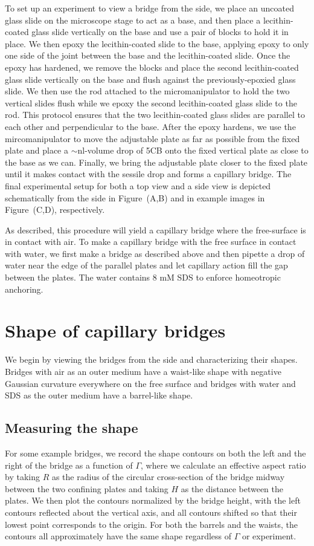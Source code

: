 To set up an experiment to view a bridge from the side, we place an uncoated glass slide on the microscope stage to act as a base, and then place a lecithin-coated glass slide vertically on the base and use a pair of blocks to hold it in place.
We then epoxy the lecithin-coated slide to the base, applying epoxy to only one side of the joint between the base and the lecithin-coated slide.
Once the epoxy has hardened, we remove the blocks and place the second lecithin-coated glass slide vertically on the base and flush against the previously-epoxied glass slide.
We then use the rod attached to the micromanipulator to hold the two vertical slides flush while we epoxy the second lecithin-coated glass slide to the rod.
This protocol ensures that the two lecithin-coated glass slides are parallel to each other and perpendicular to the base.
After the epoxy hardens, we use the mircomanipulator to move the adjustable plate as far as possible from the fixed plate and place a $\sim$nl-volume drop of 5CB onto the fixed vertical plate as close to the base as we can.
Finally, we bring the adjustable plate closer to the fixed plate until it makes contact with the sessile drop and forms a capillary bridge.
The final experimental setup for both a top view and a side view is depicted schematically from the side in Figure~(A,B) and in example images in Figure~(C,D), respectively.

As described, this procedure will yield a capillary bridge where the free-surface is in contact with air.
To make a capillary bridge with the free surface in contact with water, we first make a bridge as described above and then pipette a drop of water near the edge of the parallel plates and let capillary action fill the gap between the plates.
The water contains 8 mM SDS to enforce homeotropic anchoring.




\section{Shape of capillary bridges}
We begin by viewing the bridges from the side and characterizing their shapes.
Bridges with air as an outer medium have a waist-like shape with negative Gaussian curvature everywhere on the free surface and bridges with water and SDS as the outer medium have a barrel-like shape.


\subsection{Measuring the shape}
For some example bridges, we record the shape contours on both the left and the right of the bridge as a function of $\Gamma$, where we calculate an effective aspect ratio by taking $R$ as the radius of the circular cross-section of the bridge midway between the two confining plates and taking $H$ as the distance between the plates.
We then plot the contours normalized by the bridge height, with the left contours reflected about the vertical axis, and all contours shifted so that their lowest point corresponds to the origin.
For both the barrels and the waists, the contours all approximately have the same shape regardless of $\Gamma$ or experiment.


